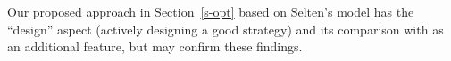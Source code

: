 \documentclass[a4paper,12pt]{article}  %
\theoremstyle{definition}
\begin{document}
Our proposed approach in Section~\ref{s-opt}
based on Selten's model has the
``design'' aspect (actively designing a good strategy) 
and its comparison with \citet{Keser1992}
as an additional feature, but may confirm these findings.

% 
% 


%
%
\small

 
\end{document}
